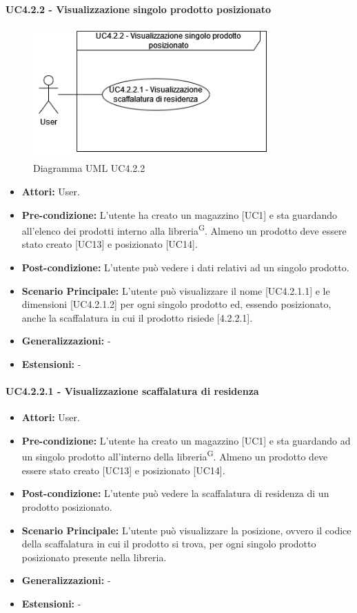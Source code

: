 \paragraph{UC4.2.2 - Visualizzazione singolo prodotto posizionato}
\begin{figure}[H]
  \centering
  \includegraphics[width=0.8\textwidth]{UC_diagrams_1-10/UC4.2.2.drawio.png}
   \caption{Diagramma UML UC4.2.2}
\end{figure}
\begin{itemize}
    \item \textbf{Attori:} User.
    \item \textbf{Pre-condizione:}  L'utente ha creato un magazzino [UC1] e sta guardando all'elenco dei prodotti interno alla libreria\textsuperscript{G}. Almeno un prodotto deve essere stato creato [UC13] e posizionato [UC14].
    \item \textbf{Post-condizione:}  L'utente può vedere i dati relativi ad un singolo prodotto.
    \item \textbf{Scenario Principale:}  L'utente può visualizzare il nome [UC4.2.1.1] e le dimensioni [UC4.2.1.2] per ogni singolo prodotto ed, essendo posizionato, anche la scaffalatura in cui il prodotto risiede [4.2.2.1]. 
    \item \textbf{Generalizzazioni:} -
    \item \textbf{Estensioni:} -
\end{itemize}


\paragraph{UC4.2.2.1 - Visualizzazione scaffalatura di residenza}
\begin{itemize} 
    \item \textbf{Attori:} User.
    \item \textbf{Pre-condizione:}  L'utente ha creato un magazzino [UC1] e sta guardando ad un singolo prodotto all'interno della libreria\textsuperscript{G}. Almeno un prodotto deve essere stato creato [UC13] e posizionato [UC14].
    \item \textbf{Post-condizione:} L'utente può vedere la scaffalatura di residenza di un prodotto posizionato.
    \item \textbf{Scenario Principale:} L'utente può visualizzare la posizione, ovvero il codice della scaffalatura in cui il prodotto si trova, per ogni singolo prodotto posizionato presente nella libreria. 
    \item \textbf{Generalizzazioni:} -
    \item \textbf{Estensioni:} -
\end{itemize}